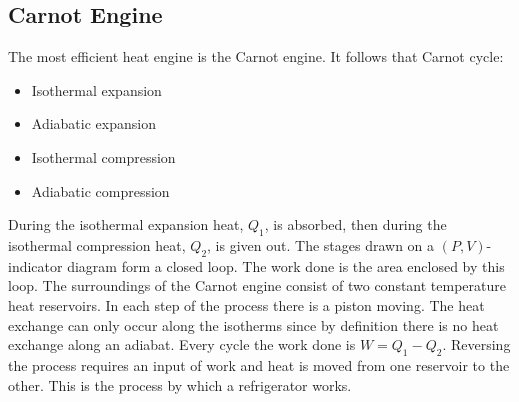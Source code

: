 \documentclass[a4paper]{article}
\begin{document}
    \subsection{Carnot Engine}
    The most efficient heat engine is the Carnot engine.
    It follows that Carnot cycle:
    \begin{itemize}
        \item Isothermal expansion
        \item Adiabatic expansion
        \item Isothermal compression
        \item Adiabatic compression
    \end{itemize}
    During the isothermal expansion heat, \(Q_1\), is absorbed, then during the isothermal compression heat, \(Q_2\), is given out.
    The stages drawn on a \((P, V)\)-indicator diagram form a closed loop.
    The work done is the area enclosed by this loop.
    The surroundings of the Carnot engine consist of two constant temperature heat reservoirs.
    In each step of the process there is a piston moving.
    The heat exchange can only occur along the isotherms since by definition there is no heat exchange along an adiabat.
    Every cycle the work done is \(W = Q_1 - Q_2\).
    Reversing the process requires an input of work and heat is moved from one reservoir to the other.
    This is the process by which a refrigerator works.
\end{document}
